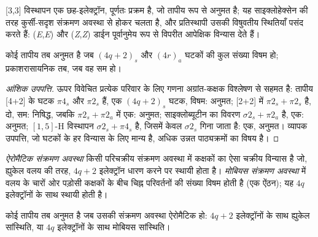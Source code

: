 [3,3] विस्थापन एक छह-इलेक्ट्रॉन, पूर्णतः  प्रक्रम है, जो तापीय रूप से अनुमत है;
यह साइक्लोहेक्सेन की तरह कुर्सी-सदृश संक्रमण अवस्था से होकर चलता है, और
प्रतिस्थापी उसकी विषुवतीय स्थितियाँ पसंद करते हैं: (\textit{E},\textit{E}) और (\textit{Z},\textit{Z}) डाईन
पूर्वानुमेय रूप से विपरीत आपेक्षिक विन्यास देते हैं।

\begin{theorem}[वुडवर्ड--हॉफ़मैन नियम]\label{thm:b3:pericyclic:woodward-hoffmann}
कोई तापीय  तब अनुमत है जब $(4q + 2)_s$ और
$(4r)_a$ घटकों की कुल संख्या विषम हो; प्रकाशरासायनिक तब, जब वह सम हो।
\end{theorem}

\begin{proof}[आंशिक उपपत्ति]
ऊपर विवेचित प्रत्येक परिवार के लिए गणना अग्रांत-कक्षक
विश्लेषण से सहमत है: तापीय [4+2]  के घटक $\pi4_s$ और $\pi2_s$ हैं, एक $(4q + 2)_s$
घटक, विषम: अनुमत; [2+2] में $\pi2_s + \pi2_s$ है, दो, सम: निषिद्ध, जबकि
$\pi2_s + \pi2_a$ में एक: अनुमत; साइक्लोब्यूटीन का  विवरण $\sigma2_s + \pi2_a$ है, एक:
अनुमत;  $[1,5]$-H विस्थापन $\sigma2_s + \pi4_s$ है, जिसमें केवल $\sigma2_s$ गिना जाता है: एक,
अनुमत। व्यापक उपपत्ति, जो घटकों के हर विन्यास के लिए मान्य है, अधिक उन्नत
पाठ्यक्रमों का विषय है।
\end{proof}

\begin{definition}\label{def:b3:pericyclic:mobius}
\emph{ऐरोमैटिक संक्रमण अवस्था} किसी परिचक्रीय संक्रमण
अवस्था में कक्षकों का ऐसा चक्रीय विन्यास है जो, ह्युकेल वलय की तरह,
$4q + 2$ इलेक्ट्रॉन धारण करने पर स्थायी होता है। \emph{मोबियस संक्रमण
अवस्था} में वलय के चारों ओर पड़ोसी कक्षकों के बीच
चिह्न परिवर्तनों की संख्या विषम होती है (एक  ऐंठन); यह
$4q$ इलेक्ट्रॉनों के साथ स्थायी होती है।
\end{definition}

\begin{proposition}\label{prop:b3:pericyclic:aromatic-ts}
कोई तापीय  तब अनुमत है जब उसकी संक्रमण अवस्था ऐरोमैटिक हो:
$4q + 2$ इलेक्ट्रॉनों के साथ ह्युकेल सांस्थिति, या $4q$ इलेक्ट्रॉनों के साथ मोबियस सांस्थिति।
\end{proposition}

